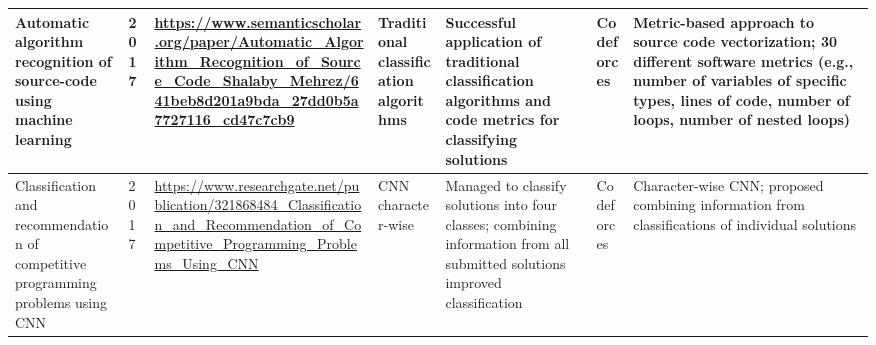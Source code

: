 \documentclass{article}
\begin{document}
\begin{itemize}
\begin{longtable}{|p{2cm}|p{0.8cm}|p{2cm}|p{2cm}|p{3cm}|p{2cm}|p{3cm}|}
              \hline
              \endfoot
              
              \hline
              \endlastfoot
              
              
              Automatic algorithm recognition of source-code using machine
              learning
                             & 2017
                             & \href{https://www.semanticscholar.org/paper/Automatic_Algorithm_Recognition_of_Source_Code_Shalaby_Mehrez/641beb8d201a9bda_27dd0b5a7727116_cd47c7cb9}{\url{https://www.semanticscholar.org/paper/Automatic_Algorithm_Recognition_of_Source_Code_Shalaby_Mehrez/641beb8d201a9bda_27dd0b5a7727116_cd47c7cb9}}

              
              
              
                             & Traditional classification algorithms 
                             & Successful application of traditional classification algorithms and code metrics for classifying solutions 
                             & Codeforces 
                             & Metric-based approach to source code vectorization; 30 different software metrics (e.g., number of variables of specific types, lines of code, number of loops, number of nested loops)                                                                                                                                                                                                                \\
              
              \hline
              Classification and recommendation of competitive programming problems
              using CNN
                             & 2017
                             & \href{https://www.researchgate.net/publication/321868484_Classification_and_Recommendation_of_Competitive_Programming_Problems_Using_CNN}{\url{https://www.researchgate.net/publication/321868484_Classification_and_Recommendation_of_Competitive_Programming_Problems_Using_CNN}}

              
              
              
                             & CNN character-wise 
                             & Managed to classify solutions into four classes; combining information from all submitted solutions improved classification 
                             & Codeforces 
                             & Character-wise CNN; proposed combining information from classifications of individual solutions                                                                                                                                                                                                                                                                                                        \\
              
              \hline
              
          \end{longtable}

             
\end{itemize}
\end{document}

